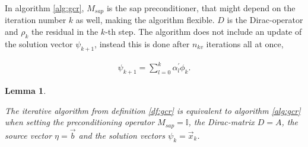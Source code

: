 \documentclass{article}
\theoremstyle{plain} %
\newtheorem{lemma}[theorem]{Lemma}
\theoremstyle{convention} %
\theoremstyle{remark} %
\numberwithin{equation}{section}
\begin{document}
In algorithm \ref{alg:gcr}, $M_{sap}$ is the \acrshort{sap} preconditioner, that might depend on the iteration number $k$ as well, making the algorithm flexible. $D$ is the Dirac-operator and $\rho_k$ the residual in the $k$-th step. The algorithm does not include an update of the solution vector $\psi_{k+1}$, instead this is done after $n_{kv}$ iterations all at once,

\begin{align}
    \psi_{k+1} = \sum_{l=0}^k \alpha^{\prime}_l \phi_k. \label{eq:gcr:step:paper}
\end{align}

\begin{lemma}

\label{lem:gcr_equiv}

The iterative algorithm from definition \ref{df:gcr} is equivalent to algorithm \ref{alg:gcr} when setting the preconditioning operator $M_{sap} = \mathbb{I}$, the Dirac-matrix $D = A$, the source vector $\eta = \vec{b}$ and the solution vectors $\psi_k = \vec{x}_k$.

\end{lemma}
\end{document}

